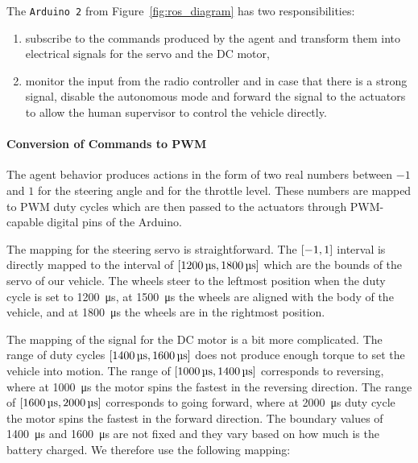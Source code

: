 The \verb|Arduino 2| from Figure~\ref{fig:ros_diagram} has two responsibilities:

\begin{enumerate}[label=(\roman*)]
	\item subscribe to the commands produced by the agent and transform them into electrical signals for the servo and the \gls*{DC} motor,
	\item monitor the input from the radio controller and in case that there is a strong signal, disable the autonomous mode and forward the signal to the actuators to allow the human supervisor to control the vehicle directly.
\end{enumerate}

\paragraph{Conversion of Commands to PWM}

The agent behavior produces actions in the form of two real numbers between $-1$ and $1$ for the steering angle and for the throttle level. These numbers are mapped to \gls*{PWM} duty cycles which are then passed to the actuators through PWM-capable digital pins of the Arduino.

The mapping for the steering servo is straightforward. The $\interval{-1}{1}$ interval is directly mapped to the interval of $\interval{\SI{1200}{\micro\second}}{\SI{1800}{\micro\second}}$ which are the bounds of the servo of our vehicle. The wheels steer to the leftmost position when the duty cycle is set to \SI{1200}{\micro\second}, at \SI{1500}{\micro\second} the wheels are aligned with the body of the vehicle, and at \SI{1800}{\micro\second} the wheels are in the rightmost position.

The mapping of the signal for the \gls*{DC} motor is a bit more complicated. The range of duty cycles $\interval{\SI{1400}{\micro\second}}{\SI{1600}{\micro\second}}$ does not produce enough torque to set the vehicle into motion. The range of $\interval{\SI{1000}{\micro\second}}{\SI{1400}{\micro\second}}$ corresponds to reversing, where at \SI{1000}{\micro\second} the motor spins the fastest in the reversing direction. The range of $\interval{\SI{1600}{\micro\second}} {\SI{2000}{\micro\second}}$ corresponds to going forward, where at \SI{2000}{\micro\second} duty cycle the motor spins the fastest in the forward direction. The boundary values of \SI{1400}{\micro\second} and \SI{1600}{\micro\second} are not fixed and they vary based on how much is the battery charged. We therefore use the following mapping:

